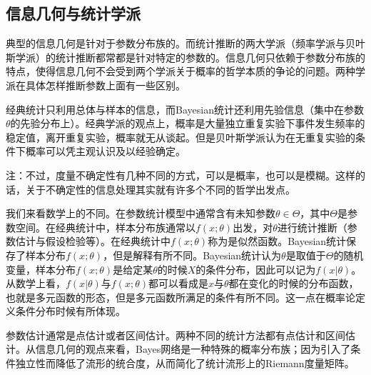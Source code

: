 \subsection{信息几何与统计学派}

典型的信息几何是针对于参数分布族的。而统计推断的两大学派（频率学派与贝叶斯学派）的统计推断都常都是针对特定的参数的。信息几何只依赖于参数分布族的特点，使得信息几何不会受到两个学派关于概率的哲学本质的争论的问题。两种学派在具体怎样推断参数上面有一些区别。

经典统计只利用总体与样本的信息，而Bayesian统计还利用先验信息（集中在参数$\theta$的先验分布上）。经典学派的观点上，概率是大量独立重复实验下事件发生频率的稳定值，离开重复实验，概率就无从谈起。但是贝叶斯学派认为在无重复实验的条件下概率可以凭主观认识及以经验确定。

注：不过，度量不确定性有几种不同的方式，可以是概率，也可以是模糊。这样的话，关于不确定性的信息处理其实就有许多个不同的哲学出发点。

我们来看数学上的不同。在参数统计模型中通常含有未知参数$\theta \in \Theta$，其中$\Theta$是参数空间。在经典统计中，样本分布族通常以$f(x;\theta)$出发，对$\theta$进行统计推断（参数估计与假设检验等）。在经典统计中$f(x;\theta)$称为是似然函数。Bayesian统计保存了样本分布$f(x;\theta)$，但是解释有所不同。Bayesian统计认为$\theta$是取值于$\Theta$的随机变量，样本分布$f(x;\theta)$是给定某$\theta$的时候$X$的条件分布，因此可以记为$f(x \vert \theta)$。从数学上看，$f(x \vert \theta)$与$f(x;\theta)$都可以看成是$x$与$\theta$都在变化的时候的分布函数，也就是多元函数的形态，但是多元函数所满足的条件有所不同。这一点在概率论定义条件分布时候有所体现。

参数估计通常是点估计或者区间估计。两种不同的统计方法都有点估计和区间估计。从信息几何的观点来看，Bayes网络是一种特殊的概率分布族；因为引入了条件独立性而降低了流形的统合度，从而简化了统计流形上的Riemann度量矩阵。
